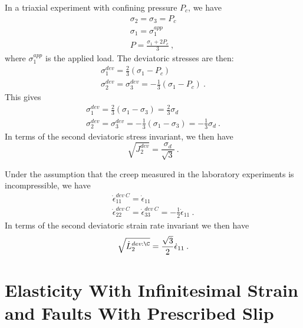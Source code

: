 In a triaxial experiment with confining pressure $P_{c}$, we have
\begin{gather}
  \sigma_{2}=\sigma_{3}=P_{c}\\
  \sigma_{1}=\sigma_{1}^{app}\\
  P=\frac{\sigma_{1}+2P_{c}}{3}\:,
\end{gather}
where $\sigma_{1}^{app}$ is the applied load. The deviatoric stresses
are then:
\begin{gather}
  \sigma_{1}^{dev}=\frac{2}{3}\left(\sigma_{1}-P_{c}\right)\nonumber \\
  \sigma_{2}^{dev}=\sigma_{3}^{dev}=-\frac{1}{3}\left(\sigma_{1}-P_{c}\right)\:.
\end{gather}
This gives
\begin{gather}
  \sigma_{1}^{dev}=\frac{2}{3}\left(\sigma_{1}-\sigma_{3}\right)=\frac{2}{3}\sigma_{d} \\
  \sigma_{2}^{dev}=\sigma_{3}^{dev}=-\frac{1}{3}\left(\sigma_{1}-\sigma_{3}\right)=-\frac{1}{3}\sigma_{d}\:.
\end{gather}
In terms of the second deviatoric stress invariant, we then have
\begin{equation}
  \sqrt{J_{2}^{dev}}=\frac{\sigma_{d}}{\sqrt{3}}\:.
\end{equation}

Under the assumption that the creep measured in the laboratory experiments
is incompressible, we have
\begin{gather}
  \dot{\epsilon}_{11}^{dev\:C}=\dot{\epsilon}_{11}\\
  \dot{\epsilon}_{22}^{dev\:C}=\dot{\epsilon}_{33}^{dev\:C}=-\frac{1}{2}\dot{\epsilon}_{11}\:.
\end{gather}
In terms of the second deviatoric strain rate invariant we then have
\begin{equation}
  \sqrt{\dot{L}_{2}^{dev:\C}}=\frac{\sqrt{3}}{2}\dot{\epsilon}_{11}\:.
\end{equation}

\section{Elasticity With Infinitesimal Strain and Faults With Prescribed Slip}

